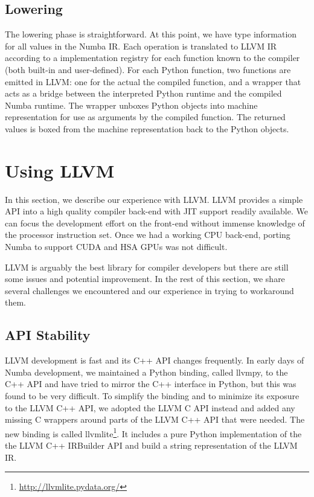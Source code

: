 \documentclass{acm_proc_article-sp}
\begin{document}
\subsection{Lowering}

The lowering phase is straightforward.  At this point, we have type
information for all values in the Numba IR. Each operation is
translated to LLVM IR according to a implementation registry for each
function known to the compiler (both built-in and user-defined).  For
each Python function, two functions are emitted in LLVM: one for the
actual the compiled function, and a wrapper that acts as a bridge
between the interpreted Python runtime and the compiled Numba
runtime. The wrapper unboxes Python objects into machine
representation for use as arguments by the compiled function.  The
returned values is boxed from the machine representation back to the
Python objects.


\section{Using LLVM}

In this section, we describe our experience with LLVM.
LLVM provides a simple API into a high quality compiler back-end with
JIT support readily available. We can focus the development effort
on the front-end without immense knowledge of the processor instruction set.
Once we had a working CPU back-end, porting Numba to support CUDA and HSA GPUs
was not difficult.

LLVM is arguably the best library for compiler developers but there are still
some issues and potential improvement. In the rest of
this section, we share several challenges we encountered and our experience
in trying to workaround them.

\subsection{API Stability}

LLVM development is fast and its C++ API changes frequently.  In early
days of Numba development, we maintained a Python binding, called
llvmpy, to the C++ API and have tried to mirror the C++ interface in
Python, but this was found to be very difficult.  To simplify the
binding and to minimize its exposure to the LLVM C++ API, we adopted
the LLVM C API instead and added any missing C wrappers around parts
of the LLVM C++ API that were needed.  The new binding is called
llvmlite\footnote{\url{http://llvmlite.pydata.org/}}.  It includes a
pure Python implementation of the the LLVM C++ IRBuilder API and build
a string representation of the LLVM IR.
\end{document}
